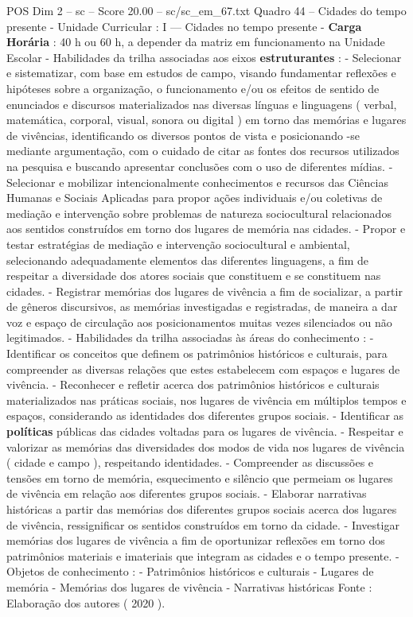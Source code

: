 \begin{textsample}{POS Dim 2 – sc – Score 20.00 – sc/sc\_em\_67.txt}
Quadro 44 – Cidades do tempo presente - Unidade Curricular : I — Cidades no tempo presente - \textbf{Carga} \textbf{Horária} : 40 h ou 60 h, a depender da matriz em funcionamento na Unidade Escolar - Habilidades da trilha associadas aos eixos \textbf{estruturantes} : - Selecionar e sistematizar, com base em estudos de campo, visando fundamentar reflexões e hipóteses sobre a organização, o funcionamento e/ou os efeitos de sentido de enunciados e discursos materializados nas diversas línguas e linguagens ( verbal, matemática, corporal, visual, sonora ou digital ) em torno das memórias e lugares de vivências, identificando os diversos pontos de vista e posicionando -se mediante argumentação, com o cuidado de citar as fontes dos recursos utilizados na pesquisa e buscando apresentar conclusões com o uso de diferentes mídias. - Selecionar e mobilizar intencionalmente conhecimentos e recursos das Ciências Humanas e Sociais Aplicadas para propor ações individuais e/ou coletivas de mediação e intervenção sobre problemas de natureza sociocultural relacionados aos sentidos construídos em torno dos lugares de memória nas cidades. - Propor e testar estratégias de mediação e intervenção sociocultural e ambiental, selecionando adequadamente elementos das diferentes linguagens, a fim de respeitar a diversidade dos atores sociais que constituem e se constituem nas cidades. - Registrar memórias dos lugares de vivência a fim de socializar, a partir de gêneros discursivos, as memórias investigadas e registradas, de maneira a dar voz e espaço de circulação aos posicionamentos muitas vezes silenciados ou não legitimados. - Habilidades da trilha associadas às áreas do conhecimento : - Identificar os conceitos que definem os patrimônios históricos e culturais, para compreender as diversas relações que estes estabelecem com espaços e lugares de vivência. - Reconhecer e refletir acerca dos patrimônios históricos e culturais materializados nas práticas sociais, nos lugares de vivência em múltiplos tempos e espaços, considerando as identidades dos diferentes grupos sociais. - Identificar as \textbf{políticas} públicas das cidades voltadas para os lugares de vivência. - Respeitar e valorizar as memórias das diversidades dos modos de vida nos lugares de vivência ( cidade e campo ), respeitando identidades. - Compreender as discussões e tensões em torno de memória, esquecimento e silêncio que permeiam os lugares de vivência em relação aos diferentes grupos sociais. - Elaborar narrativas históricas a partir das memórias dos diferentes grupos sociais acerca dos lugares de vivência, ressignificar os sentidos construídos em torno da cidade. - Investigar memórias dos lugares de vivência a fim de oportunizar reflexões em torno dos patrimônios materiais e imateriais que integram as cidades e o tempo presente. - Objetos de conhecimento : - Patrimônios históricos e culturais - Lugares de memória - Memórias dos lugares de vivência - Narrativas históricas Fonte : Elaboração dos autores ( 2020 ).

\end{textsample}
